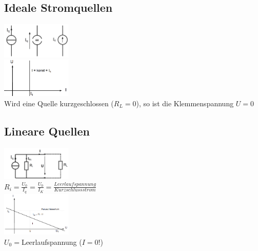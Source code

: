 \subsection{Ideale Stromquellen}
\begin{multicols}{4}
\includegraphics[width=0.25\textwidth]{pics/quellen/IQsymbole}\\
\includegraphics[width=0.25\textwidth]{pics/quellen/QIkennlinie}\\
Wird eine Quelle kurzgeschlossen ($R_L = 0$), so ist die Klemmenspannung $U=0$\\
\end{multicols}

\subsection{Lineare Quellen}
\begin{multicols}{4}
\includegraphics[width=0.25\textwidth]{pics/quellen/lIEquellen}\\
$R_i=\frac{U_0}{I_q}=\frac{U_0}{I_K}=\frac{Leerlaufspannung}{Kurzschlussstrom}$\\
\includegraphics[width=0.25\textwidth]{pics/quellen/IUkennlinie}\\
$U_0=$Leerlaufspannung ($I=0!$)\\

\end{multicols}

